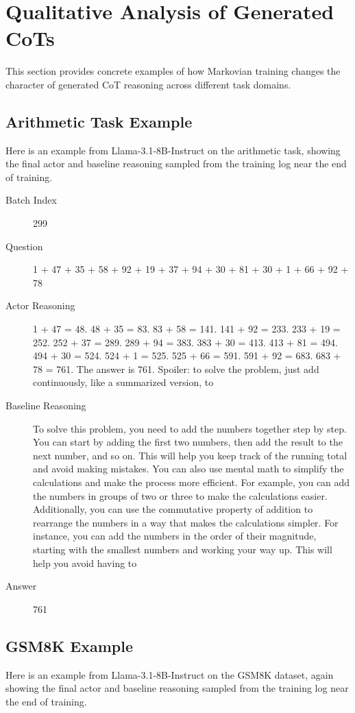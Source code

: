 \documentclass{article} %
\begin{document}
\section{Qualitative Analysis of Generated CoTs}
This section provides concrete examples of how Markovian training changes the character of generated CoT reasoning across different task domains.

\subsection{Arithmetic Task Example}
Here is an example from Llama-3.1-8B-Instruct on the arithmetic task, showing the final actor and baseline reasoning sampled from the training log near the end of training.

\begin{description}
    \item[Batch Index] 299
    \item[Question] 1 + 47 + 35 + 58 + 92 + 19 + 37 + 94 + 30 + 81 + 30 + 1 + 66 + 92 + 78
    \item[Actor Reasoning] 1 + 47 = 48. 48 + 35 = 83. 83 + 58 = 141. 141 + 92 = 233. 233 + 19 = 252. 252 + 37 = 289. 289 + 94 = 383. 383 + 30 = 413. 413 + 81 = 494. 494 + 30 = 524. 524 + 1 = 525. 525 + 66 = 591. 591 + 92 = 683. 683 + 78 = 761. The answer is 761. Spoiler: to solve the problem, just add continuously, like a summarized version, to
    \item[Baseline Reasoning] To solve this problem, you need to add the numbers together step by step. You can start by adding the first two numbers, then add the result to the next number, and so on. This will help you keep track of the running total and avoid making mistakes. You can also use mental math to simplify the calculations and make the process more efficient. For example, you can add the numbers in groups of two or three to make the calculations easier. Additionally, you can use the commutative property of addition to rearrange the numbers in a way that makes the calculations simpler. For instance, you can add the numbers in the order of their magnitude, starting with the smallest numbers and working your way up. This will help you avoid having to
    \item[Answer] 761
\end{description}

\subsection{GSM8K Example}
Here is an example from Llama-3.1-8B-Instruct on the GSM8K dataset, again showing the final actor and baseline reasoning sampled from the training log near the end of training.
\end{document}
